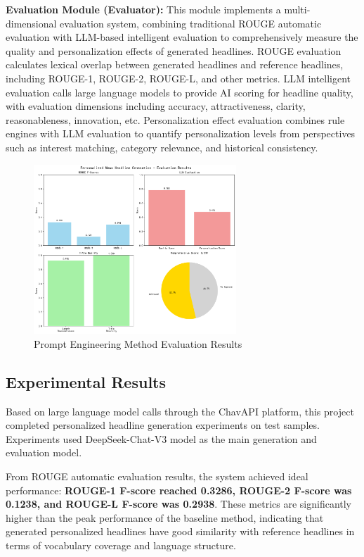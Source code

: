 \documentclass[10pt,a4paper]{article}
\begin{document}
\textbf{Evaluation Module (Evaluator):} This module implements a multi-dimensional evaluation system, combining traditional ROUGE automatic evaluation with LLM-based intelligent evaluation to comprehensively measure the quality and personalization effects of generated headlines. ROUGE evaluation calculates lexical overlap between generated headlines and reference headlines, including ROUGE-1, ROUGE-2, ROUGE-L, and other metrics. LLM intelligent evaluation calls large language models to provide AI scoring for headline quality, with evaluation dimensions including accuracy, attractiveness, clarity, reasonableness, innovation, etc. Personalization effect evaluation combines rule engines with LLM evaluation to quantify personalization levels from perspectives such as interest matching, category relevance, and historical consistency.

\begin{figure}[H]
  \centering
  \includegraphics[width=0.68\textwidth]{fig/evaluation_chart_20250622_212308.png}   
  \caption{Prompt Engineering Method Evaluation Results}\label{fig:prompt_evaluation}
\end{figure}

\subsection{Experimental Results}
Based on large language model calls through the ChavAPI platform, this project completed personalized headline generation experiments on test samples. Experiments used DeepSeek-Chat-V3 model as the main generation and evaluation model.

From ROUGE automatic evaluation results, the system achieved ideal performance: \textbf{ROUGE-1 F-score reached 0.3286, ROUGE-2 F-score was 0.1238, and ROUGE-L F-score was 0.2938}. These metrics are significantly higher than the peak performance of the baseline method, indicating that generated personalized headlines have good similarity with reference headlines in terms of vocabulary coverage and language structure.
\end{document}

